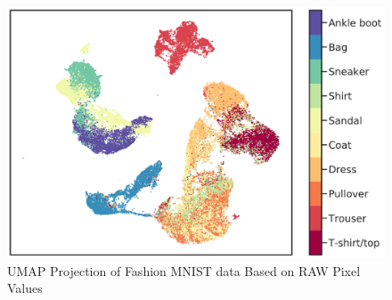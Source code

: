 \begin{figure}[t]
  \centering
  \includegraphics[width=\columnwidth]{Figures/Fashion_MNIST_UMAP.pdf}
  \caption{UMAP Projection of Fashion MNIST data Based on RAW Pixel Values}
  \label{fig:Fashion_MNIST_UMAP}
  \vspace{-1em}
\end{figure}
